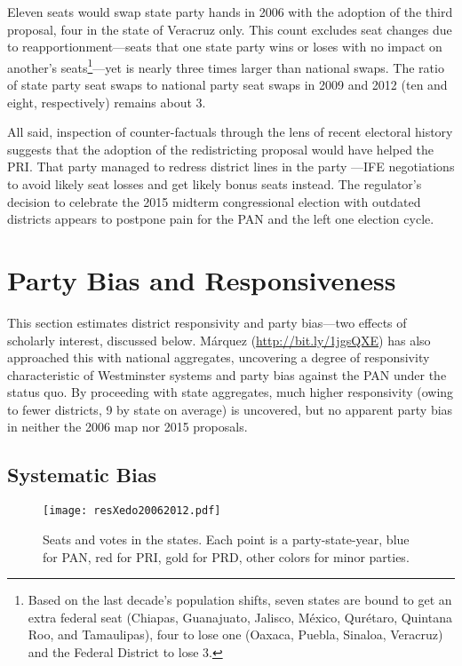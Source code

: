 \documentclass[letter,12pt]{article}
\begin{document}
Eleven seats would swap state party hands in 2006 with the adoption of the third proposal, four in the state of Veracruz only. This count excludes seat changes due to reapportionment---seats that one state party wins or loses with no impact on another's seats\footnote{Based on the last decade's population shifts, seven states are bound to get an extra federal seat (Chiapas, Guanajuato, Jalisco, M\'exico, Qur\'etaro, Quintana Roo, and Tamaulipas), four to lose one (Oaxaca, Puebla, Sinaloa, Veracruz) and the Federal District to lose 3.}---yet is nearly three times larger than national swaps. The ratio of state party seat swaps to national party seat swaps in 2009 and 2012 (ten and eight, respectively) remains about 3. 

All said, inspection of counter-factuals through the lens of recent electoral history suggests that the adoption of the redistricting proposal would have helped the PRI. That party managed to redress district lines in the party ---IFE negotiations to avoid likely seat losses and get likely bonus seats instead. The regulator's decision to celebrate the 2015 midterm congressional election with outdated districts appears to postpone pain for the PAN and the left one election cycle. 


\section{Party Bias and Responsiveness}

This section estimates district responsivity and party bias---two effects of scholarly interest, discussed below. M\'arquez (\href{http://bit.ly/1jgsQXE}{\url{http://bit.ly/1jgsQXE}}) has also approached this with national aggregates, uncovering a degree of responsivity characteristic of Westminster systems and party bias against the PAN under the status quo. By proceeding with state aggregates, much higher responsivity (owing to fewer districts, 9 by state on average) is uncovered, but no apparent party bias in neither the 2006 map nor 2015 proposals. 

\subsection{Systematic Bias}

\begin{figure}
\begin{center}
    \texttt{[image: resXedo20062012.pdf]} 
\caption{Seats and votes in the states. Each point is a party-state-year, blue for PAN, red for PRI, gold for PRD, other colors for minor parties.}\label{F:seatsVotes}
\end{center}
\end{figure}
\end{document}
